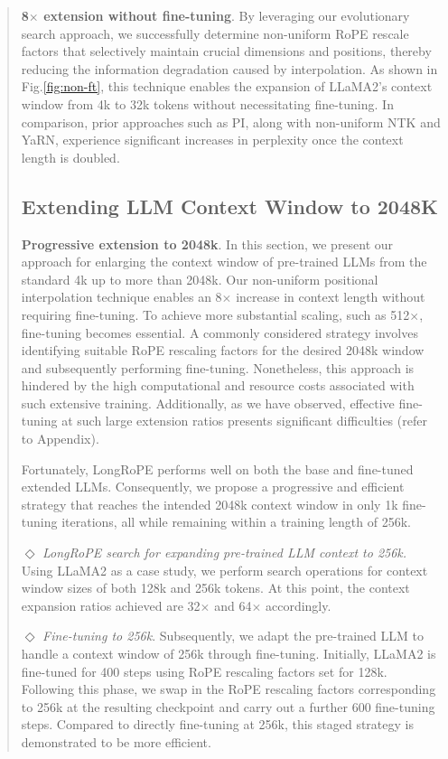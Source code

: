 \begin{abstract}
\textbf{8$\times$ extension without fine-tuning}. By leveraging our evolutionary search approach, we successfully determine non-uniform RoPE rescale factors that selectively maintain crucial dimensions and positions, thereby reducing the information degradation caused by interpolation. As shown in Fig.\ref{fig:non-ft}, this technique enables the expansion of LLaMA2's context window from 4k to 32k tokens without necessitating fine-tuning. In comparison, prior approaches such as PI, along with non-uniform NTK and YaRN, experience significant increases in perplexity once the context length is doubled.

\subsection{Extending LLM Context Window to 2048K}
\label{sec:extendto2048k}

\textbf{Progressive extension to 2048k}. In this section, we present our approach for enlarging the context window of pre-trained LLMs from the standard 4k up to more than 2048k. Our non-uniform positional interpolation technique enables an 8$\times$ increase in context length without requiring fine-tuning. To achieve more substantial scaling, such as 512$\times$, fine-tuning becomes essential. A commonly considered strategy involves identifying suitable RoPE rescaling factors for the desired 2048k window and subsequently performing fine-tuning. Nonetheless, this approach is hindered by the high computational and resource costs associated with such extensive training. Additionally, as we have observed, effective fine-tuning at such large extension ratios presents significant difficulties (refer to Appendix).

Fortunately, LongRoPE performs well on both the base and fine-tuned extended LLMs. Consequently, we propose a progressive and efficient strategy that reaches the intended 2048k context window in only 1k fine-tuning iterations, all while remaining within a training length of 256k.

$\Diamond$ \textit{LongRoPE search for expanding pre-trained LLM context to 256k.} Using LLaMA2 as a case study, we perform search operations for context window sizes of both 128k and 256k tokens. At this point, the context expansion ratios achieved are 32$\times$ and 64$\times$ accordingly.

$\Diamond$ \textit{Fine-tuning to 256k}. Subsequently, we adapt the pre-trained LLM to handle a context window of 256k through fine-tuning. Initially, LLaMA2 is fine-tuned for 400 steps using RoPE rescaling factors set for 128k. Following this phase, we swap in the RoPE rescaling factors corresponding to 256k at the resulting checkpoint and carry out a further 600 fine-tuning steps. Compared to directly fine-tuning at 256k, this staged strategy is demonstrated to be more efficient.


\end{abstract}
